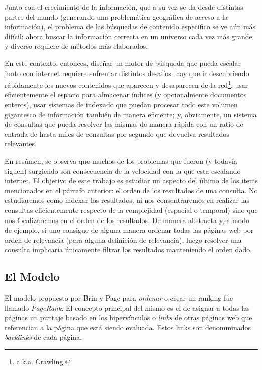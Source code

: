 \par Junto con el crecimiento de la informaci\'on, que a su vez se da desde
distintas partes del mundo (generando una problem\'atica geogr\'afica de acceso
a la informaci\'on), el problema de las b\'usquedas de contenido espec\'ifico se
ve a\'un m\'as dif\'icil: ahora buscar la informaci\'on correcta en un universo
cada vez m\'as grande y diverso requiere de m\'etodos m\'as elaborados.

\par En este contexto, entonces, dise\~nar un motor de b\'usqueda que pueda
escalar junto con internet requiere enfrentar distintos desaf\'ios: hay que ir
descubriendo r\'apidamente los nuevos contenidos que aparecen y desaparecen de
la red\footnote{a.k.a. Crawling.}, usar eficientemente el espacio para almacenar
\'indices (y opcionalmente documentos enteros), usar sistemas de indexado que puedan
procesar todo este volumen gigantesco de informaci\'on tambi\'en de manera
eficiente; y, obviamente, un sistema de consultas que pueda resolver las mismas
de manera r\'apida con un ratio de entrada de hasta miles de consultas por
segundo que devuelva resultados relevantes.

\par En res\'umen, se observa que muchos de los problemas que fueron (y todav\'ia
siguen) surgiendo son consecuencia de la velocidad con la que esta escalando
internet. El objetivo de este trabajo es estudiar un aspecto del \'ultimo de los
items mencionados en el p\'arrafo anterior: el orden de los resultados de una
consulta. No estudiaremos como indexar los resultados, ni nos consentraremos en
realizar las consultas eficientemente respecto de la complejidad (espacial o
temporal) sino que nos focalizaremos en el orden de los resultados. De manera
abstracta y, a modo de ejemplo, si uno consigue de alguna manera ordenar todas
las p\'aginas web por orden de relevancia (para alguna definici\'on de relevancia),
luego resolver una consulta implicar\'ia \'unicamente filtrar los resultados
manteniendo el orden dado.

\subsection{El Modelo}\label{subsec:intro_pagerank}
\par El modelo propuesto por Brin y Page para \emph{ordenar} o crear un ranking
fue llamado \emph{PageRank}. El concepto principal del mismo es el de asignar a
todas las p\'aginas un puntaje basado en los hiperv\'inculos o \emph{links} de
otras p\'aginas web que referencian a la p\'agina que está siendo evaluada. Estos links
son denomminados \emph{backlinks} de cada p\'agina.

